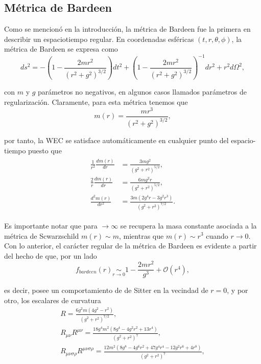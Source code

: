 \documentclass[16pt,a4paper]{article}
\numberwithin{equation}{section}
\theoremstyle{definition}
\begin{document}
\subsection{\label{bardeen section} Métrica de Bardeen}

Como se mencionó en la introducción, la métrica de Bardeen \cite{bardeen} fue la primera en describir un espaciotiempo regular. En coordenadas esféricas $(t,r,\theta,\phi)$, la métrica de Bardeen se expresa como
\begin{equation}
\label{bardeen metric}
ds^2 = -\left( 1 - \frac{2mr^2}{(r^2 + g^2)^{3/2}} \right)dt^2 + \left( 1 - \frac{2mr^2}{(r^2 + g^2)^{3/2}} \right)^{-1}dr^2 + r^2d\Omega^2,
\end{equation}

con $m$ y $g$ parámetros no negativos, en algunos casos llamados parámetros de regularización. Claramente, para esta métrica tenemos que 
\begin{equation}
m(r) = \frac{mr^3}{(r^2 + g^2)^{3/2}},
\end{equation}

por tanto, la WEC se satisface automáticamente en cualquier punto del espacio-tiempo puesto que 
\begin{align}
\begin{aligned}
\frac{1}{r^2}\frac{dm(r)}{dr} &= \frac{3 m g^2}{\left(g^2+r^2\right)^{5/2}},\\
\frac{2}{r}\frac{dm(r)}{dr} &= \frac{6 m g^2 r}{\left(g^2+r^2\right)^{5/2}},\\
\frac{d^2m(r)}{dr^2} &= \frac{3 m \left(2 g^4 r-3 g^2 r^3\right)}{\left(g^2+r^2\right)^{7/2}}.
\end{aligned}
\end{align}

Es importante notar que para $ \to \infty$ se recupera la masa constante asociada a la métrica de Scwarzschild $m(r) \sim m$, mientras que $m(r) \sim r^3$ cuando $r \to 0$. Con lo anterior, el carácter regular de la métrica de Bardeen es evidente a partir del hecho de que, por un lado
\begin{equation}
f_{bardeen}(r) \underset{r \to 0}{\sim} 1 - \frac{2mr^2}{g^3} + \mathcal{O}(r^4),
\end{equation}

es decir, posee un comportamiento de de Sitter en la vecindad de $r = 0$, y por otro, los escalares de curvatura
\begin{equation}
\label{bardeen scalars}
\begin{gathered}
R = \frac{6 g^2 m \left(4 g^2-r^2\right)}{\left(g^2+r^2\right)^{7/2}},\\
R_{\mu \nu}R^{\mu \nu} = \frac{18 g^4 m^2 \left(8 g^4-4 g^2 r^2+13 r^4\right)}{\left(g^2+r^2\right)^7},\\
R_{\mu \nu \sigma \rho}R^{\mu \nu \sigma \rho} = \frac{12 m^2 \left(8 g^8-4 g^6 r^2+47 g^4 r^4-12 g^2 r^6+4 r^8\right)}{\left(g^2+r^2\right)^7},
\end{gathered}
\end{equation}
\end{document}
